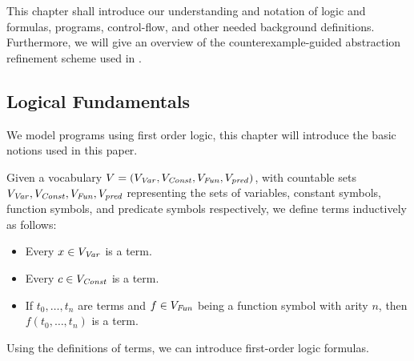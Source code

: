 
\begin{comment}
	This chapter is mostly focused on trace abstraction $\rightarrow$  It introduces the reader to the concept of trace abstraction. \\
	- Introduce logic, logical variables, terms, formulas, transition formulas with primed and unprimed variables, programs, program states, loops $\rightarrow$  then program-, error traces, feasible and infeasible counterexamples, CFGs, interpolants. \\ - From intuitive to true definitions. \\
	Here the running example from the introduction gets dissected to illustrate the definitions. \\ 
	Further the problems loops can cause are introduced, followed by a definition of loop summaries $\rightarrow$ introduction reflexive transitive closure of a formula 
	15 pages
\end{comment}

This chapter shall introduce our understanding and notation of logic and formulas, programs, control-flow, and other needed background definitions. Furthermore, we will give an overview of the \traceabstraction \cite{10.1007/978-3-642-03237-0_7} counterexample-guided abstraction refinement scheme used in \ultimate.

\subsection{Logical Fundamentals}
We model programs using first order logic, this chapter will introduce the basic notions used in this paper.
\begin{mydef}[Term] 
	Given a vocabulary $V = (V_{\mathit{Var}}, V_{\mathit{Const}}, V_{\mathit{Fun}}, V_{\mathit{pred}})$, with countable sets \\ $V_{\mathit{\mathit{Var}}}, V_{\mathit{Const}}, V_{\mathit{Fun}}, V_{\mathit{pred}}$ representing the sets of variables, constant symbols, function symbols, and predicate symbols respectively, we define terms inductively as follows:
	\begin{itemize}
		\item Every $x \in V_{\mathit{Var}}$ is a term.
		\item Every $c \in V_{\mathit{Const}}$ is a term.
		\item If $t_0, \ldots, t_n$ are terms and $f \in V_{\mathit{Fun}}$ being a function symbol with arity $n$, then $f(t_0, \ldots, t_n)$ is a term.
	\end{itemize}
\end{mydef}
Using the definitions of terms, we can introduce first-order logic formulas.

